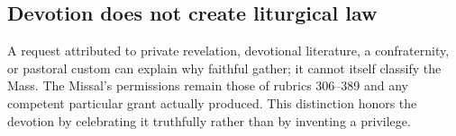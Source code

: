 \subsection{Devotion does not create liturgical law}

A request attributed to private revelation, devotional literature, a confraternity, or pastoral custom can explain why faithful gather; it cannot itself classify the Mass. The Missal's permissions remain those of rubrics 306--389 and any competent particular grant actually produced. This distinction honors the devotion by celebrating it truthfully rather than by inventing a privilege.
